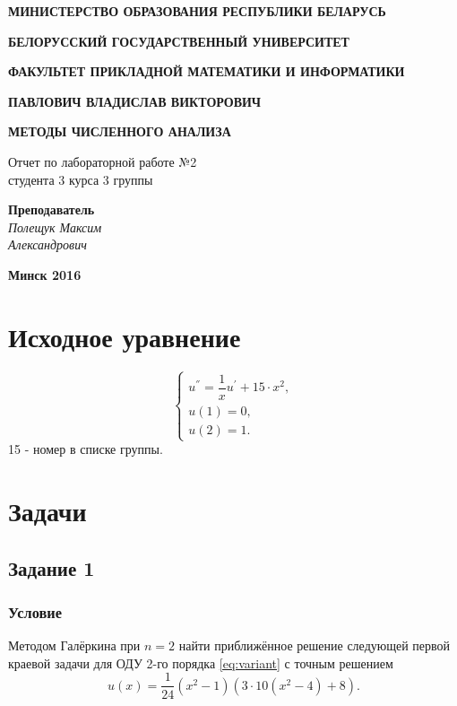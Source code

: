\documentclass[oneside, final, 12pt]{article}
\begin{document}
\begin{titlepage}



\centerline{\large \bf МИНИСТЕРСТВО ОБРАЗОВАНИЯ РЕСПУБЛИКИ БЕЛАРУСЬ}
\bigskip
\bigskip
\centerline{\large \bf БЕЛОРУССКИЙ ГОСУДАРСТВЕННЫЙ УНИВЕРСИТЕТ}
\bigskip
\bigskip
\centerline{\large \bf ФАКУЛЬТЕТ ПРИКЛАДНОЙ МАТЕМАТИКИ И ИНФОРМАТИКИ}
\vfill
\vfill
\vfill
\centerline{\large \bf ПАВЛОВИЧ ВЛАДИСЛАВ ВИКТОРОВИЧ}
\bigskip
\bigskip
\centerline{\Large \bf МЕТОДЫ ЧИСЛЕННОГО АНАЛИЗА}
\vfill
\begin{centering}
  {\large
  Отчет по лабораторной работе №2 \\
  студента 3 курса 3 группы \\}
\end{centering}
\vfill
\vfill
\hfill
\begin{minipage}{0.25\textwidth}
  {\large{\bf Преподаватель} \\
  {\it Полещук Максим \\ Александрович}}
\end{minipage}
\vfill
\vfill
\centerline{\Large \bf Минск 2016}

\end{titlepage}

\restoregeometry

\section{Исходное уравнение}
\begin{equation}
    \label{eq:variant}
    \begin{cases}
    u^{''} = \dfrac{1}{x} u^{'} + 15 \cdot x^2,\\ u(1) = 0, \\ u(2) = 1.
    \end{cases}
\end{equation}
15 - номер в списке группы.

\section{Задачи}
\subsection{Задание 1}
\subsubsection{Условие}
Методом Галёркина при $n = 2$ найти приближённое решение следующей первой краевой задачи для ОДУ 2-го порядка \eqref{eq:variant} с точным решением
\begin{equation}
    \label{eq:exactsolution}
    u(x) = \dfrac{1}{24} (x^2 - 1) (3 \cdot 10 (x^2 - 4) + 8).
\end{equation}
\end{document}
